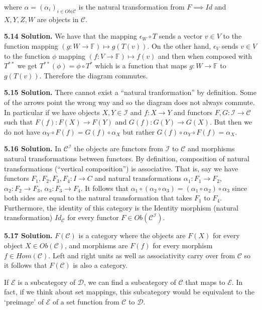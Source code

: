 where $\alpha = (\alpha_i)_{i \in Ob(\mathcal{C}}$ is the natural transformation from $F \implies Id$ and $X, Y, Z, W$ are objects in $\mathcal{C}$.

\textbf{5.14 Solution.} We have that the mapping $\epsilon_W \circ T$ sends a vector $v \in V$ to the function mapping $(g: W \to \mathbb{F}) \mapsto g(T(v))$. On the other hand, $\epsilon_V$ sends $v \in V$ to the function $\phi$ mapping $(f: V \to \mathbb{F}) \mapsto f(v)$ and then when composed with $T^{**}$ we get $T^{**}(\phi) = \phi \circ T^*$ which is a function that maps $g: W \to \mathbb{F}$ to $g(T(v))$. Therefore the diagram commutes.

\textbf{5.15 Solution.} There cannot exist a ``natural tranformation'' by definition. Some of the arrows point the wrong way and so the diagram does not always commute. In particular if we have objects $X, Y \in \mathcal{I}$ and $f: X \to Y$ and functors $F, G: \mathcal{I} \to \mathcal{C}$ such that $F(f): F(X) \to F(Y)$ and $G(f): G(Y) \to G(X)$. But then we do not have $\alpha_Y \circ F(f) = G(f) \circ \alpha_X$ but rather $G(f) \circ \alpha_Y \circ F(f) = \alpha_X$.

\textbf{5.16 Solution.} In $\mathcal{C}^{\mathcal{I}}$ the objects are functors from $\mathcal{I}$ to $\mathcal{C}$ and morphisms natural transformations between functors. By definition, composition of natural transformations (``vertical composition'') is associative. That is, say we have functors $F_1, F_2, F_3, F_4: I \to C$ and natural transformations $\alpha_1: F_1 \to F_2$, $\alpha_2: F_2 \to F_3$, $\alpha_3: F_3 \to F_4$. It follows that $\alpha_1 \circ (\alpha_2 \circ \alpha_3) = (\alpha_1 \circ \alpha_2) \circ \alpha_3$ since both sides are equal to the natural transformation that takes $F_1$ to $F_4$. Furthermore, the identity of this category is the Identity morphism (natural transformation) $Id_{\mathcal{C}}$ for every functor $F \in Ob(\mathcal{C}^{\mathcal{I}})$.

\textbf{5.17 Solution.} $F(\mathcal{C})$ is a category where the objects are $F(X)$ for every object $X \in Ob(\mathcal{C})$, and morphisms are $F(f)$ for every morphism $f \in Hom(\mathcal{C})$. Left and right units as well as associativity carry over from $\mathcal{C}$ so it follows that $F(\mathcal{C})$ is also a category.

If $\mathcal{E}$ is a subcategory of $\mathcal{D}$, we can find a subcategory of $\mathcal{C}$ that maps to $\mathcal{E}$. In fact, if we think about set mappings, this subcategory would be equivalent to the `preimage' of $\mathcal{E}$ of a set function from $\mathcal{C}$ to $\mathcal{D}$.

